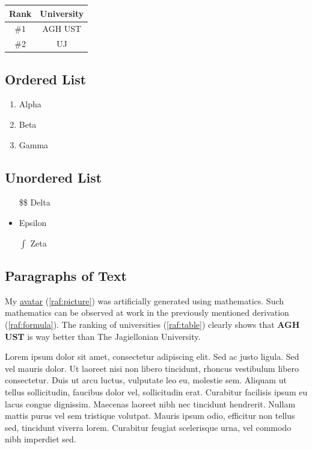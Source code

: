 \begin{center}
    \begin{tabular}{ |c|c| } 
        \hline
        Rank & University \\
        \hline
        \#1 & AGH UST \\
        \#2 & UJ \\
        \hline
    \end{tabular}
\end{center}

\subsection{Ordered List}

\begin{enumerate}
    \item Alpha
    \item Beta
    \item Gamma
\end{enumerate}

\subsection{Unordered List}

\begin{itemize}
    \item[\$\$] Delta
    \item Epsilon
    \item[$\int$] Zeta
\end{itemize}

\subsection{Paragraphs of Text}

My \underline{avatar} (\ref{raf:picture}) was artificially generated using mathematics. Such mathematics can be observed at work in the previously mentioned derivation (\ref{raf:formula}). The ranking of universities (\ref{raf:table}) clearly shows that \textbf{AGH UST} is way better than \large The Jagiellonian University. \normalsize

Lorem ipsum dolor sit amet, consectetur adipiscing elit. Sed ac justo ligula. Sed vel mauris dolor. Ut laoreet nisi non libero tincidunt, rhoncus vestibulum libero consectetur. Duis ut arcu luctus, vulputate leo eu, molestie sem. Aliquam ut tellus sollicitudin, faucibus dolor vel, sollicitudin erat. Curabitur facilisis ipsum eu lacus congue dignissim. Maecenas laoreet nibh nec tincidunt hendrerit. Nullam mattis purus vel sem tristique volutpat. Mauris ipsum odio, efficitur non tellus sed, tincidunt viverra lorem. Curabitur feugiat scelerisque urna, vel commodo nibh imperdiet sed.
